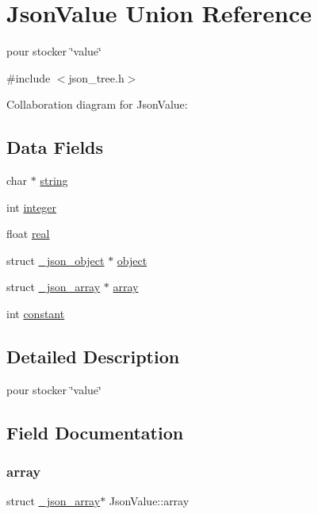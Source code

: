 \hypertarget{unionJsonValue}{}\section{Json\+Value Union Reference}
\label{unionJsonValue}


pour stocker \char`\"{}value\char`\"{}  




{\ttfamily \#include $<$json\+\_\+tree.\+h$>$}



Collaboration diagram for Json\+Value\+:
\subsection*{Data Fields}
\begin{DoxyCompactItemize}
\item 
char $\ast$ \hyperlink{unionJsonValue_abfc034211c14bf442394b50cd9bd25c3}{string}
\item 
int \hyperlink{unionJsonValue_a8ad081bed26b75c17d904fe0259190ce}{integer}
\item 
float \hyperlink{unionJsonValue_a7ab518d4c29bdc56ea65e72ba984872d}{real}
\item 
struct \hyperlink{struct__json__object}{\+\_\+json\+\_\+object} $\ast$ \hyperlink{unionJsonValue_a634382a792f07e862035cb971746c34d}{object}
\item 
struct \hyperlink{struct__json__array}{\+\_\+json\+\_\+array} $\ast$ \hyperlink{unionJsonValue_a29a36d35245a375e447f14ee321d0011}{array}
\item 
int \hyperlink{unionJsonValue_a3c63422483d2ea2c4c3bff331c274cbe}{constant}
\end{DoxyCompactItemize}


\subsection{Detailed Description}
pour stocker \char`\"{}value\char`\"{} 

\subsection{Field Documentation}
\mbox{\label{unionJsonValue_a29a36d35245a375e447f14ee321d0011}} 
\subsubsection{\texorpdfstring{array}{array}}
{\footnotesize\ttfamily struct \hyperlink{struct__json__array}{\+\_\+json\+\_\+array}$\ast$ Json\+Value\+::array}

